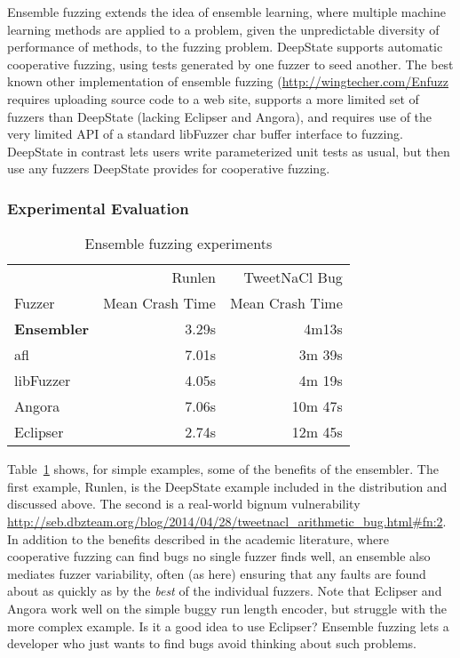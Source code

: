 \documentclass[sigconf]{acmart}
\begin{document}
Ensemble fuzzing \cite{chen2019enfuzz} extends the idea of ensemble learning, where multiple machine learning methods are applied to a problem, given the unpredictable diversity of performance of methods, to the fuzzing problem.  DeepState supports automatic cooperative fuzzing, using tests generated by one fuzzer to seed another.  The best known other implementation of ensemble fuzzing (\url{http://wingtecher.com/Enfuzz} requires uploading source code to a web site, supports a more limited set of fuzzers than DeepState (lacking Eclipser and Angora), and requires use of the very limited API of a standard libFuzzer char buffer interface to fuzzing.  DeepState in contrast lets users write parameterized unit tests as usual, but then use any fuzzers DeepState provides for cooperative fuzzing.

\subsubsection{Experimental Evaluation}

\begin{table}
\centering
\begin{tabular}{l|r|r}
 & Runlen & TweetNaCl Bug \\
  Fuzzer & Mean Crash Time & Mean Crash Time \\
  \hline
  {\bf Ensembler} & 3.29s & 4m13s \\
  afl & 7.01s & 3m 39s \\
  libFuzzer & 4.05s & 4m 19s \\
  Angora & 7.06s & 10m 47s \\
  Eclipser & 2.74s & 12m 45s \\
\end{tabular}
\caption{Ensemble fuzzing experiments}
\label{tab:ensemble}
\end{table}

Table~\ref{tab:ensemble} shows, for simple examples, some of the benefits of the ensembler.  The first example, Runlen, is the DeepState example included in the distribution and discussed above.  The second is a real-world bignum vulnerability \url{http://seb.dbzteam.org/blog/2014/04/28/tweetnacl_arithmetic_bug.html\#fn:2}.  In addition to the benefits described in the academic literature, where cooperative fuzzing can find bugs no single fuzzer finds well, an ensemble also mediates fuzzer variability, often (as here) ensuring that any faults are found about as quickly as by the \emph{best} of the individual fuzzers.  Note that Eclipser and Angora work well on the simple buggy run length encoder, but struggle with the more complex example.  Is it a good idea to use Eclipser?  Ensemble fuzzing lets a developer who just wants to find bugs avoid thinking about such problems.
\end{document}
